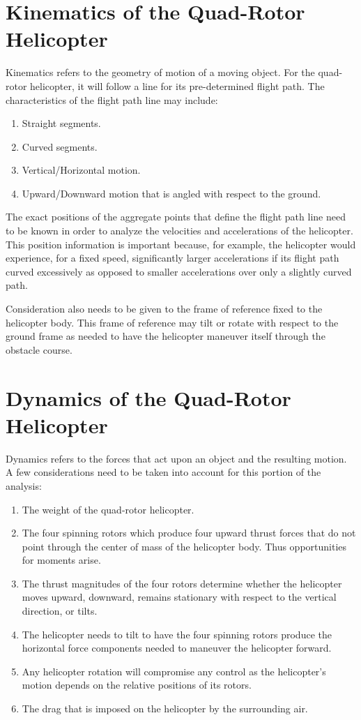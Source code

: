 \documentclass[journal]{IEEEtran}
\begin{document}
\section{Kinematics of the Quad-Rotor Helicopter}
\label{sec:kinematics_section}

Kinematics refers to the geometry of motion of a moving object. For the quad-rotor
helicopter, it will follow a line for its pre-determined flight path. The characteristics
of the flight path line may include:

\begin{enumerate}
\item Straight segments.
\item Curved segments.
\item Vertical/Horizontal motion.
\item Upward/Downward motion that is angled with respect to the ground.
\end{enumerate}

The exact positions of the aggregate points that define the flight path line need to be
known in order to analyze the velocities and accelerations of the helicopter. This 
position information is important because, for example, the helicopter would experience,
for a fixed speed, significantly larger accelerations if its flight path 
curved excessively as opposed to smaller accelerations over only a slightly curved path. 

Consideration also needs to be given to the frame of reference fixed to the
helicopter body. This frame of reference may tilt or rotate with respect to the ground
frame as needed to have the helicopter maneuver itself through the obstacle course. 

\section{Dynamics of the Quad-Rotor Helicopter}
\label{sec:dynamics_section}

Dynamics refers to the forces that act upon an object and the resulting motion. 
A few considerations need to be taken into account for this portion of the analysis:

\begin{enumerate}
\item The weight of the quad-rotor helicopter. 
\item The four spinning rotors which produce four upward thrust forces that do not point
through the center of mass of the helicopter body. Thus opportunities for moments
arise.
\item The thrust magnitudes of the four rotors determine whether the helicopter moves
upward, downward, remains stationary with respect to the vertical direction, or tilts. 
\item The helicopter needs to tilt to have the four spinning rotors produce the
horizontal force components needed to maneuver the helicopter forward.
\item Any helicopter rotation will compromise any control as the helicopter's motion
depends on the relative positions of its rotors.
\item The drag that is imposed on the helicopter by the surrounding air.  
\end{enumerate}
\end{document}
